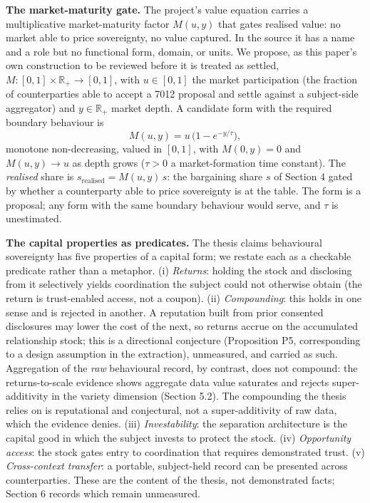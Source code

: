 \documentclass[
  11pt,
]{article}
\begin{document}
\textbf{The market-maturity gate.} The project's value equation carries
a multiplicative market-maturity factor \(M(u,y)\) that gates realised
value: no market able to price sovereignty, no value captured. In the
source it has a name and a role but no functional form, domain, or
units. We propose, as this paper's own construction to be reviewed
before it is treated as settled, \(M : [0,1] \times
\mathbb{R}_+ \to [0,1]\), with \(u \in [0,1]\) the market participation
(the fraction of counterparties able to accept a 7012 proposal and
settle against a subject-side aggregator) and \(y \in \mathbb{R}_+\)
market depth. A candidate form with the required boundary behaviour is
\[M(u,y) = u\,\bigl(1 - e^{-y/\tau}\bigr),\] monotone non-decreasing,
valued in \([0,1]\), with \(M(0,y)=0\) and \(M(u,y)\to u\) as depth
grows (\(\tau>0\) a market-formation time constant). The \emph{realised}
share is \(s_{\text{realised}} = M(u,y)\, s\): the bargaining share
\(s\) of Section 4 gated by whether a counterparty able to price
sovereignty is at the table. The form is a proposal; any form with the
same boundary behaviour would serve, and \(\tau\) is unestimated.

\textbf{The capital properties as predicates.} The thesis claims
behavioural sovereignty has five properties of a capital form; we
restate each as a checkable predicate rather than a metaphor. (i)
\emph{Returns}: holding the stock and disclosing from it selectively
yields coordination the subject could not otherwise obtain (the return
is trust-enabled access, not a coupon). (ii) \emph{Compounding}: this
holds in one sense and is rejected in another. A reputation built from
prior consented disclosures may lower the cost of the next, so returns
accrue on the accumulated relationship stock; this is a directional
conjecture (Proposition P5, corresponding to a design assumption in the
extraction), unmeasured, and carried as such. Aggregation of the
\emph{raw} behavioural record, by contrast, does not compound: the
returns-to-scale evidence shows aggregate data value saturates and
rejects super-additivity in the variety dimension (Section 5.2). The
compounding the thesis relies on is reputational and conjectural, not a
super-additivity of raw data, which the evidence denies. (iii)
\emph{Investability}: the separation architecture is the capital good in
which the subject invests to protect the stock. (iv) \emph{Opportunity
access}: the stock gates entry to coordination that requires
demonstrated trust. (v) \emph{Cross-context transfer}: a portable,
subject-held record can be presented across counterparties. These are
the content of the thesis, not demonstrated facts; Section 6 records
which remain unmeasured.
\end{document}
